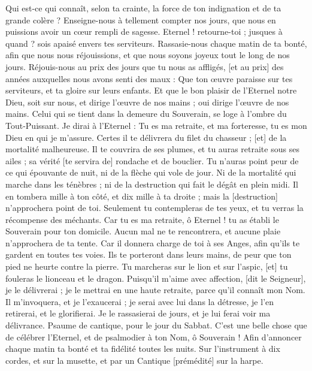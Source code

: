 \begin{multicols}{2}
Qui est-ce qui connaît, selon ta crainte, la force de ton indignation et de ta grande colère ?
Enseigne-nous à tellement compter nos jours, que nous en puissions avoir un cœur rempli de sagesse.
Eternel ! retourne-toi ; jusques à quand ? sois apaisé envers tes serviteurs.
Rassasie-nous chaque matin de ta bonté, afin que nous nous réjouissions, et que nous soyons joyeux tout le long de nos jours.
Réjouis-nous au prix des jours que tu nous as affligés, [et au prix] des années auxquelles nous avons senti des maux :
Que ton œuvre paraisse sur tes serviteurs, et ta gloire sur leurs enfants.
Et que le bon plaisir de l'Eternel notre Dieu, soit sur nous, et dirige l'œuvre de nos mains ; oui dirige l'œuvre de nos mains.
\VerseOne{}Celui qui se tient dans la demeure du Souverain, se loge à l'ombre du Tout-Puissant.
Je dirai à l'Eternel : Tu es ma retraite, et ma forteresse, tu es mon Dieu en qui je m'assure.
Certes il te délivrera du filet du chasseur ; [et] de la mortalité malheureuse.
Il te couvrira de ses plumes, et tu auras retraite sous ses ailes ; sa vérité [te servira de] rondache et de bouclier.
Tu n'auras point peur de ce qui épouvante de nuit, ni de la flèche qui vole de jour.
Ni de la mortalité qui marche dans les ténèbres ; ni de la destruction qui fait le dégât en plein midi.
Il en tombera mille à ton côté, et dix mille à ta droite ; mais la [destruction] n'approchera point de toi.
Seulement tu contempleras de tes yeux, et tu verras la récompense des méchants.
Car tu es ma retraite, ô Eternel ! tu as établi le Souverain pour ton domicile.
Aucun mal ne te rencontrera, et aucune plaie n'approchera de ta tente.
Car il donnera charge de toi à ses Anges, afin qu'ils te gardent en toutes tes voies.
Ils te porteront dans leurs mains, de peur que ton pied ne heurte contre la pierre.
Tu marcheras sur le lion et sur l'aspic, [et] tu fouleras le lionceau et le dragon.
Puisqu'il m'aime avec affection, [dit le Seigneur], je le délivrerai ; je le mettrai en une haute retraite, parce qu'il connaît mon Nom.
Il m'invoquera, et je l'exaucerai ; je serai avec lui dans la détresse, je l'en retirerai, et le glorifierai.
Je le rassasierai de jours, et je lui ferai voir ma délivrance.
\VerseOne{}Psaume de cantique, pour le jour du Sabbat. C'est une belle chose que de célébrer l'Eternel, et de psalmodier à ton Nom, ô Souverain !
Afin d'annoncer chaque matin ta bonté et ta fidélité toutes les nuits.
Sur l'instrument à dix cordes, et sur la musette, et par un Cantique [prémédité] sur la harpe.

\end{multicols}
